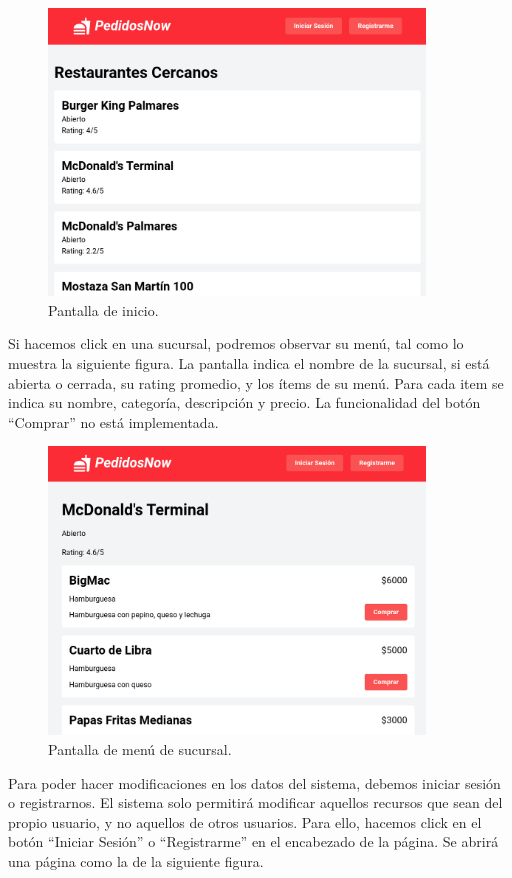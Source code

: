 \begin{figure}[H]
    \centering
    \includegraphics[width=10cm]{./img/public-locations.png}
    \caption{Pantalla de inicio.}
\end{figure}

Si hacemos click en una sucursal, podremos observar su menú, tal como lo muestra la siguiente figura. La pantalla indica el nombre de la sucursal, si está abierta o cerrada, su rating promedio, y los ítems de su menú. Para cada item se indica su nombre, categoría, descripción y precio. La funcionalidad del botón ``Comprar'' no está implementada.

\begin{figure}[H]
    \centering
    \includegraphics[width=10cm]{./img/public-items.png}
    \caption{Pantalla de menú de sucursal.}
\end{figure}

Para poder hacer modificaciones en los datos del sistema, debemos iniciar sesión o registrarnos. El sistema solo permitirá modificar aquellos recursos que sean del propio usuario, y no aquellos de otros usuarios. Para ello, hacemos click en el botón ``Iniciar Sesión'' o ``Registrarme'' en el encabezado de la página. Se abrirá una página como la de la siguiente figura.

